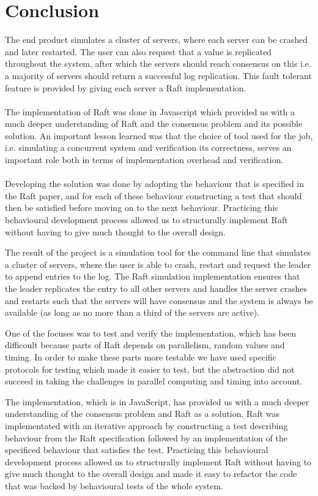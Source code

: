 \section{Conclusion} %
\label{sec:conclusion}
The end product simulates a cluster of servers, where each server can be crashed and later restarted. The user can also request that a value is replicated throughout the system, after which the servers should reach consensus on this i.e. a majority of servers should return a successful log replication. This fault tolerant feature is provided by giving each server a Raft implementation.\\ \\
The implementation of Raft was done in Javascript which provided us with a much deeper understanding of Raft and the consensus problem and its possible solution. An important lesson learned was that the choice of tool used for the job, i.e. simulating a concurrent system and verification its correctness, serves an important role both in terms of implementation overhead and verification.\\ \\
Developing the solution was done by adopting the behaviour that is specified in the Raft paper, and for each of these behaviour constructing a test that should then be satisfied before moving on to the next behaviour. Practicing this behavioural development process allowed us to structurally implement Raft without having to give much thought to the overall design.

The result of the project is a simulation tool for the command line that simulates a cluster of servers, where the user is able to crash, restart and request the leader to append entries to the log. The Raft simulation implementation ensures that the leader replicates the entry to all other servers and handles the server crashes and restarts such that the servers will have consensus and the system is always be available (as long as no more than a third of the servers are active).

One of the focuses was to test and verify the implementation, which has been difficoult because parts of Raft depends on parallelism, random values and timing. In order to make these parts more testable we have used specific protocols for testing which made it easier to test, but the abstraction did not succeed in taking the challenges in parallel computing and timing into account.

The implementation, which is in JavaScript, has provided us with a much deeper understanding of the consensus problem and Raft as a solution. Raft was implementated with an iterative approach by constructing a test describing behaviour from the Raft specification followed by an implementation of the specificed behaviour that satisfies the test. Practicing this behavioural development process allowed us to structurally implement Raft without having to give much thought to the overall design and made it easy to refactor the code that was backed by behavioural tests of the whole system.




